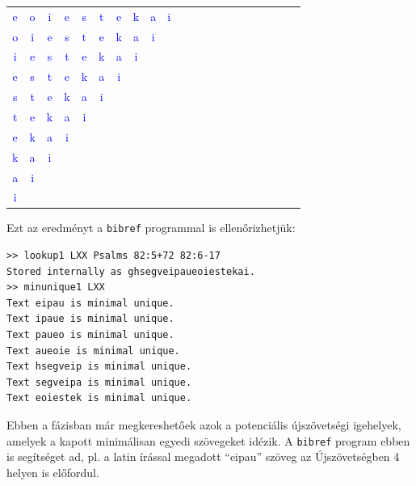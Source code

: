 \documentclass{article}
\begin{document}
\begin{center}
{\begin{tabular}{c c c c c c c c c c c c c c c c c c c c c}
\textcolor{blue}e&\textcolor{blue}o&\textcolor{blue}i&\textcolor{blue}e&\textcolor{blue}s&\textcolor{blue}t&\textcolor{blue}e&\textcolor{blue}k&\textcolor{blue}a&\textcolor{blue}i&&&&&&&&&&& \\
\textcolor{blue}o&\textcolor{blue}i&\textcolor{blue}e&\textcolor{blue}s&\textcolor{blue}t&\textcolor{blue}e&\textcolor{blue}k&\textcolor{blue}a&\textcolor{blue}i&&&&&&&&&&&& \\
\textcolor{blue}i&\textcolor{blue}e&\textcolor{blue}s&\textcolor{blue}t&\textcolor{blue}e&\textcolor{blue}k&\textcolor{blue}a&\textcolor{blue}i&&&&&&&&&&&&& \\
\textcolor{blue}e&\textcolor{blue}s&\textcolor{blue}t&\textcolor{blue}e&\textcolor{blue}k&\textcolor{blue}a&\textcolor{blue}i&&&&&&&&&&&&&& \\
\textcolor{blue}s&\textcolor{blue}t&\textcolor{blue}e&\textcolor{blue}k&\textcolor{blue}a&\textcolor{blue}i&&&&&&&&&&&&&&& \\
\textcolor{blue}t&\textcolor{blue}e&\textcolor{blue}k&\textcolor{blue}a&\textcolor{blue}i&&&&&&&&&&&&&&&& \\
\textcolor{blue}e&\textcolor{blue}k&\textcolor{blue}a&\textcolor{blue}i&&&&&&&&&&&&&&&&& \\
\textcolor{blue}k&\textcolor{blue}a&\textcolor{blue}i&&&&&&&&&&&&&&&&&& \\
\textcolor{blue}a&\textcolor{blue}i&&&&&&&&&&&&&&&&&&& \\
\textcolor{blue}i&&&&&&&&&&&&&&&&&&&& \\
\end{tabular}
}
\end{center}

Ezt az eredményt a \texttt{bibref} programmal is ellenőrizhetjük:

\begin{lstlisting}
>> lookup1 LXX Psalms 82:5+72 82:6-17
Stored internally as ghsegveipaueoiestekai.
>> minunique1 LXX
Text eipau is minimal unique.
Text ipaue is minimal unique.
Text paueo is minimal unique.
Text aueoie is minimal unique.
Text hsegveip is minimal unique.
Text segveipa is minimal unique.
Text eoiestek is minimal unique.
\end{lstlisting}

Ebben a fázisban már megkereshetőek azok a potenciális újszövetségi igehelyek,
amelyek a kapott minimálisan egyedi szövegeket idézik. A \texttt{bibref} program
ebben is segítséget ad, pl. a latin írással megadott ``eipau'' szöveg az
Újszövetségben 4 helyen is előfordul.
\end{document}
